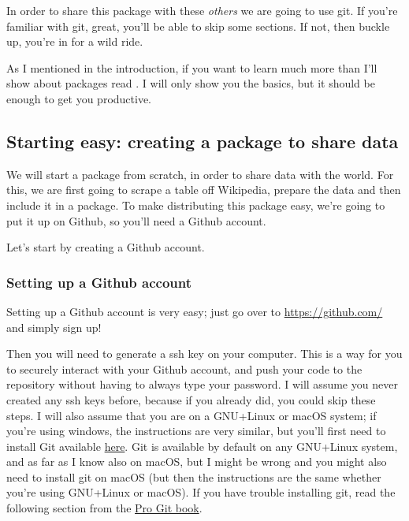 \documentclass[
]{article}
\begin{document}
In order to share this package with these \emph{others} we are going to use git. If you're familiar with
git, great, you'll be able to skip some sections. If not, then buckle up, you're in for a wild ride.

As I mentioned in the introduction, if you want to learn much more than I'll show about packages
read \citet{wickham2015}. I will only show you the basics, but it should be enough to get you productive.

\hypertarget{starting-easy-creating-a-package-to-share-data}{%
\subsection{Starting easy: creating a package to share data}\label{starting-easy-creating-a-package-to-share-data}}

We will start a package from scratch, in order to share data with the world. For this, we are first
going to scrape a table off Wikipedia, prepare the data and then include it in a package. To make
distributing this package easy, we're going to put it up on Github, so you'll need a Github account.

Let's start by creating a Github account.

\hypertarget{setting-up-a-github-account}{%
\subsubsection{Setting up a Github account}\label{setting-up-a-github-account}}

Setting up a Github account is very easy; just go over to \url{https://github.com/}
and simply sign up!

Then you will need to generate a ssh key on your computer. This is a way for you to securely
interact with your Github account, and push your code to the repository without having to always
type your password. I will assume you never created any ssh
keys before, because if you already did, you could skip these steps. I will also assume that you are
on a GNU+Linux or macOS system; if you're using windows, the instructions are very similar, but
you'll first need to install Git available \href{https://git-scm.com/downloads}{here}. Git is available
by default on any GNU+Linux system, and as far as I know also on macOS, but I might be wrong and
you might also need to install git on macOS (but then the instructions are the same whether
you're using GNU+Linux or macOS). If you have trouble installing git, read the following section
from the \href{https://git-scm.com/book/en/v2/Getting-Started-Installing-Git}{Pro Git book}.
\end{document}
